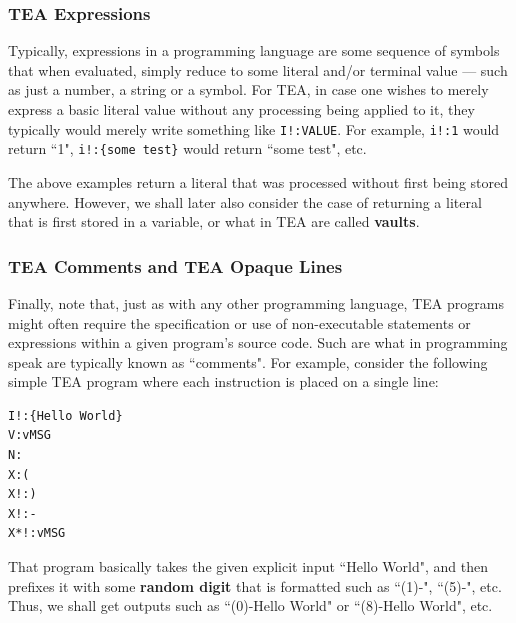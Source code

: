 \documentclass[a4paper, 18pt]{book} %
\begin{document}
{{{\begin{appendices}
\vspace{2em}

\subsubsection{TEA Expressions}

Typically, expressions in a programming language are some sequence of symbols that when evaluated, simply reduce to some literal and/or terminal value --- such as just a number, a string or a symbol. For TEA, in case one wishes to merely express a basic literal value without any processing being applied to it, they typically would merely write something like \texttt{I!:VALUE}. For example, \texttt{i!:1} would return ``1", \texttt{i!:\{some test\}} would return ``some test", etc.

\vspace{2em}

The above examples return a literal that was processed without first being stored anywhere. However, we shall later also consider the case of returning a literal that is first stored in a variable, or what in TEA are called \textbf{vaults}. 


\subsubsection{TEA Comments and TEA Opaque Lines}
\label{TEACOMMTOL}

Finally, note that, just as with any other programming language, TEA programs might often require the specification or use of non-executable statements or expressions within a given program's source code. Such are what in programming speak are typically known as ``comments". For example, consider the following simple TEA program where each instruction is placed on a single line:


\vspace{2em}

  \begin{tcolorbox}[teaterminalstyle, title=TEA COMMENTS: Example 1: Program without comments, breakable]
  \begin{lstlisting}[language=TEA,breaklines=true,]
I!:{Hello World}
V:vMSG
N:
X:(
X!:)
X!:-
X*!:vMSG
   \end{lstlisting}
  \end{tcolorbox}

\vspace{2em}

That program basically takes the given explicit input ``Hello World", and then prefixes it with some \textbf{random digit} that is formatted such as ``(1)-", ``(5)-", etc. Thus, we shall get outputs such as ``(0)-Hello World" or ``(8)-Hello World", etc.


\end{appendices}}}}
\end{document}
